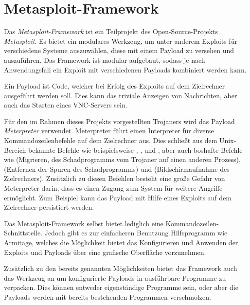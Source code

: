 \section{Metasploit-Framework \cite{MSPLH}}\label{sec:metasploit}
Das \textit{Metasploit-Framework} ist ein Teilprojekt des Open-Source-Projekts \textit{Metasploit}.
Es bietet ein modulares Werkzeug, um unter anderem Exploits für verschiedene Systeme auszuwählen,
diese mit einem Payload zu versehen und auszuführen. Das Framework ist modular aufgebaut, sodass je nach Anwendungsfall ein Exploit mit verschiedenen Payloads kombiniert werden kann.

Ein Payload ist Code, welcher bei Erfolg des Exploits auf dem Zielrechner ausgeführt werden soll.
Dies kann das triviale Anzeigen von Nachrichten, aber auch das Starten eines VNC-Servers sein.

Für den im Rahmen dieses Projekts vorgestellten Trojaners wird das Payload \textit{Meterpreter} \cite{OSMTP} verwendet.
Meterpreter führt einen Interpreter für diverse Kommandozeilenbefehle auf dem Zielrechner aus.
Dies schließt aus dem Unix-Bereich bekannte Befehle wie beispielsweise , ,  und ,
aber auch boshafte Befehle wie  (Migrieren, des Schadprogramms vom Trojaner auf einen anderen Prozess),
 (Entfernen der Spuren des Schadprogramms) und  (Bildschirmaufnahme des Zielrechners).
Zusätzlich zu diesen Befehlen besteht eine große Gefahr von Meterpreter darin, dass es einen Zugang zum System für weitere Angriffe ermöglicht.
Zum Beispiel kann das Payload mit Hilfe eines Exploits auf dem Zielrechner persistiert werden.

Das Metasploit-Framework selbst bietet lediglich eine Kommandozeilen-Schnittstelle.
Jedoch gibt es zur einfacheren Benutzung Hilfsprogramm wie Armitage,
welches die Möglichkeit bietet das Konfigurieren und Anwenden der Exploits und Payloads über eine grafische Oberfläche vorzunehmen.

Zusätzlich zu den bereits genannten Möglichkeiten bietet das Framework auch das Werkzeug  an um konfigurierte Payloads in ausführbare Programme zu verpacken.
Dies können entweder eigenständige Programme sein, oder aber die Payloads werden mit bereits bestehenden Programmen verschmolzen. 